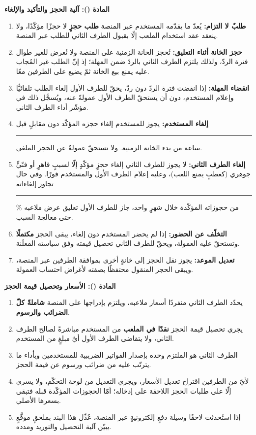 \documentclass[12pt,a4paper]{article}
\newcounter{bndc}
\newcommand{\bnd}[1]{%
  \vspace{10pt}\par\noindent
  {\color{teal}\bfseries\large المادة (\arabic{bndc}): #1}%
  \stepcounter{bndc}%
  \par\vspace{2pt}\noindent{\color{rule}\rule{\linewidth}{0.6pt}}\par\vspace{4pt}%
}
\newcommand{\blank}[1][3.2cm]{\rule[-0.4ex]{#1}{0.5pt}}
\newcommand{\mlh}[1]{{\bfseries #1}}
\newenvironment{bnditems}
  {\begin{enumerate}[label=\arabic{bndc}.\arabic*,leftmargin=1.6em,itemsep=3pt,topsep=3pt]}
  {\end{enumerate}}
\begin{document}
\bnd{آلية الحجز والتأكيد والإلغاء}\label{art:flow}
\begin{bnditems}
  \item \mlh{طلبٌ لا التزام:} يُعدّ ما يقدّمه المستخدم عبر المنصة \mlh{طلب حجزٍ} لا حجزًا مؤكّدًا، ولا ينعقد عقد استخدام الملعب إلّا بقبول الطرف الثاني للطلب عبر المنصة.
  \item \mlh{حجز الخانة أثناء التعليق:} تُحجز الخانة الزمنية على المنصة ولا تُعرض للغير طوال فترة الردّ، ولذلك يلتزم الطرف الثاني بالردّ ضمن المهلة؛ إذ إنّ الطلب غير المُجاب عليه يمنع بيع الخانة ثمّ يضيع على الطرفين معًا.
  \item \mlh{انقضاء المهلة:} إذا انقضت فترة الردّ دون ردّ، يحقّ للطرف الأول إلغاء الطلب تلقائيًّا وإعلام المستخدم، دون أن يستحقّ الطرف الأول عمولةً عنه، ويُسجَّل ذلك في مؤشّر أداء الطرف الثاني.
  \item \mlh{إلغاء المستخدم:} يجوز للمستخدم إلغاء حجزه المؤكّد دون مقابلٍ قبل \blank[1.4cm] ساعة من بدء الخانة الزمنية. ولا تستحقّ عمولةٌ عن الحجز الملغى.
  \item \mlh{إلغاء الطرف الثاني:} لا يجوز للطرف الثاني إلغاء حجزٍ مؤكّدٍ إلّا لسببٍ قاهرٍ أو فنّيٍّ جوهري (كعطبٍ يمنع اللعب)، وعليه إعلام الطرف الأول والمستخدم فورًا. وفي حال تجاوز إلغاءاته \blank[1.2cm]\% من حجوزاته المؤكّدة خلال شهرٍ واحد، جاز للطرف الأول تعليق عرض ملاعبه حتى معالجة السبب.
  \item \mlh{التخلّف عن الحضور:} إذا لم يحضر المستخدم دون إلغاء، يبقى الحجز \mlh{مكتملًا} وتستحقّ عليه العمولة، ويحقّ للطرف الثاني تحصيل قيمته وفق سياسته المعلَنة.
  \item \mlh{تعديل الموعد:} يجوز نقل الحجز إلى خانةٍ أخرى بموافقة الطرفين عبر المنصة، ويبقى الحجز المنقول محتفظًا بصفته لأغراض احتساب العمولة.
\end{bnditems}

\bnd{الأسعار وتحصيل قيمة الحجز}
\begin{bnditems}
  \item يحدّد الطرف الثاني منفردًا أسعار ملاعبه، ويلتزم بإدراجها على المنصة \mlh{شاملةً كلّ الضرائب والرسوم}.
  \item يجري تحصيل قيمة الحجز \mlh{نقدًا في الملعب} من المستخدم مباشرةً لصالح الطرف الثاني، ولا يتقاضى الطرف الأول أيّ مبلغٍ من المستخدم.
  \item الطرف الثاني هو الملتزم وحده بإصدار الفواتير الضريبية للمستخدمين وبأداء ما يترتّب عليه من ضرائب ورسوم عن قيمة الحجز.
  \item لأيّ من الطرفين اقتراح تعديل الأسعار، ويجري التعديل من لوحة التحكّم، ولا يسري إلّا على طلبات الحجز اللاحقة على إدخاله؛ أمّا الحجوزات المؤكّدة قبله فتبقى بسعرها الأصلي.
  \item إذا استُحدثت لاحقًا وسيلة دفعٍ إلكترونيةٍ عبر المنصة، عُدِّل هذا البند بملحقٍ موقَّعٍ يبيّن آلية التحصيل والتوريد ومدده.
\end{bnditems}
\end{document}
